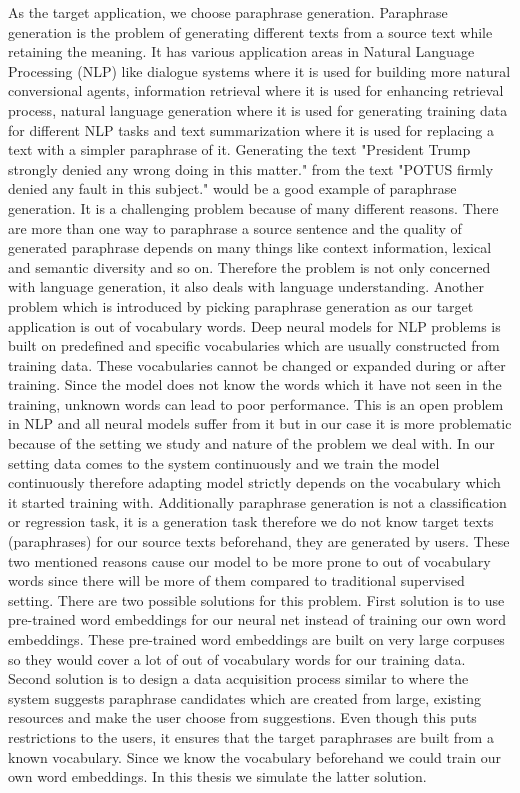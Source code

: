 As the target application, we choose paraphrase generation. Paraphrase generation is the problem of generating different texts from a source text while retaining the meaning. It has various application areas in Natural Language Processing (NLP) like dialogue systems where it is used for building more natural conversional agents, information retrieval where it is used for enhancing retrieval process, natural language generation where it is used for generating training data for different NLP tasks and text summarization where it is used for replacing a text with a simpler paraphrase of it. Generating the text "President Trump strongly denied any wrong doing in this matter." from the text "POTUS firmly denied any fault in this subject." would be a good example of paraphrase generation. It is a challenging problem because of many different reasons. There are more than one way to paraphrase a source sentence and the quality of generated paraphrase depends on many things like context information, lexical and semantic diversity and so on. Therefore the problem is not only concerned with language generation, it also deals with language understanding. Another problem which is introduced by picking paraphrase generation as our target application is out of vocabulary words. Deep neural models for NLP problems is built on predefined and specific vocabularies which are usually constructed from training data. These vocabularies cannot be changed or expanded during or after training. Since the model does not know the words which it have not seen in the training, unknown words can lead to poor performance. This is an open problem in NLP and all neural models suffer from it but in our case it is more problematic because of the setting we study and nature of the problem we deal with. In our setting data comes to the system continuously and we train the model continuously therefore adapting model strictly depends on the vocabulary which it started training with. Additionally paraphrase generation is not a classification or regression task, it is a generation task therefore we do not know target texts (paraphrases) for our source texts beforehand, they are generated by users. These two mentioned reasons cause our model to be more prone to out of vocabulary words since there will be more of them compared to traditional supervised setting. There are two possible solutions for this problem. First solution is to use pre-trained word embeddings for our neural net instead of training our own word embeddings. These pre-trained word embeddings are built on very large corpuses so they would cover a lot of out of vocabulary words for our training data. Second solution is to design a data acquisition process similar to \cite{par4sim} where the system suggests paraphrase candidates which are created from large, existing resources and make the user choose from suggestions. Even though this puts restrictions to the users, it ensures that the target paraphrases are built from a known vocabulary. Since we know the vocabulary beforehand we could train our own word embeddings. In this thesis we simulate the latter solution. 

